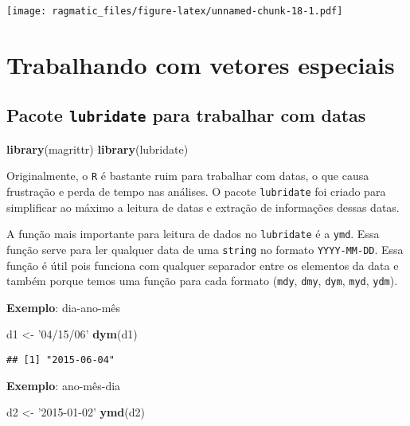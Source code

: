 \documentclass[]{book}
\newenvironment{Shaded}{\begin{snugshade}}{\end{snugshade}}
\newcommand{\KeywordTok}[1]{\textcolor[rgb]{0.13,0.29,0.53}{\textbf{{#1}}}}
\newcommand{\StringTok}[1]{\textcolor[rgb]{0.31,0.60,0.02}{{#1}}}
\newcommand{\NormalTok}[1]{{#1}}
\begin{document}
\texttt{[image: ragmatic\_files/figure-latex/unnamed-chunk-18-1.pdf]}

\chapter{Trabalhando com vetores
especiais}\label{trabalhando-com-vetores-especiais}

\section{\texorpdfstring{Pacote \texttt{lubridate} para trabalhar com
datas}{Pacote lubridate para trabalhar com datas}}\label{pacote-lubridate-para-trabalhar-com-datas}

\begin{Shaded}
\begin{Highlighting}[]
\KeywordTok{library}\NormalTok{(magrittr)}
\KeywordTok{library}\NormalTok{(lubridate)}
\end{Highlighting}
\end{Shaded}

Originalmente, o \texttt{R} é bastante ruim para trabalhar com datas, o
que causa frustração e perda de tempo nas análises. O pacote
\texttt{lubridate} foi criado para simplificar ao máximo a leitura de
datas e extração de informações dessas datas.

A função mais importante para leitura de dados no \texttt{lubridate} é a
\texttt{ymd}. Essa função serve para ler qualquer data de uma
\texttt{string} no formato \texttt{YYYY-MM-DD}. Essa função é útil pois
funciona com qualquer separador entre os elementos da data e também
porque temos uma função para cada formato (\texttt{mdy}, \texttt{dmy},
\texttt{dym}, \texttt{myd}, \texttt{ydm}).

\textbf{Exemplo}: dia-ano-mês

\begin{Shaded}
\begin{Highlighting}[]
\NormalTok{d1 <-}\StringTok{ '04/15/06'}
\KeywordTok{dym}\NormalTok{(d1)}
\end{Highlighting}
\end{Shaded}

\begin{verbatim}
## [1] "2015-06-04"
\end{verbatim}

\textbf{Exemplo}: ano-mês-dia

\begin{Shaded}
\begin{Highlighting}[]
\NormalTok{d2 <-}\StringTok{ '2015-01-02'}
\KeywordTok{ymd}\NormalTok{(d2)}
\end{Highlighting}
\end{Shaded}
\end{document}
